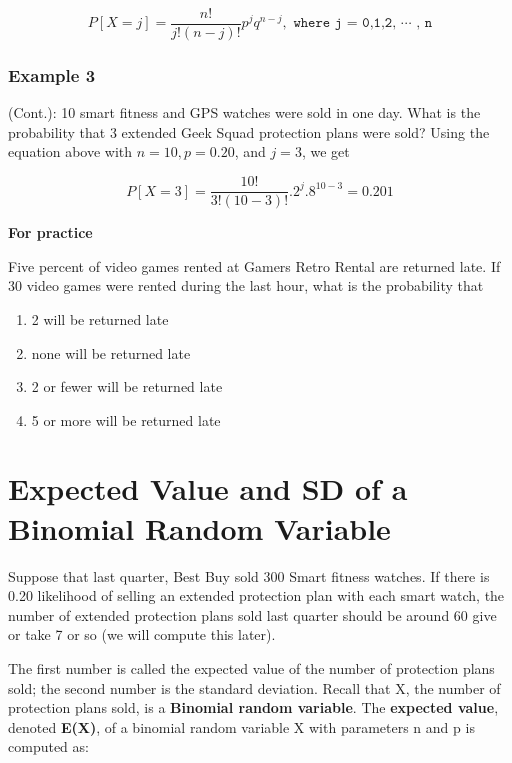 \documentclass[11pt, chapterprefix=true]{scrbook}\usepackage[]{graphicx}\usepackage[]{color}
\begin{document}
\begin{equation*}
 P[ X = j] = \frac{n!}{j! (n - j)!} p^j q^{n - j}, \texttt{ where j = 0,1,2, $\cdots$ , n}
 \end{equation*}


\subsubsection{Example 3} (Cont.):  10 smart fitness and GPS watches were sold in one day.  What is the probability that 3 extended Geek Squad protection plans were sold?  Using the equation above with $n = 10, p = 0.20$, and $j = 3$, we get

\begin{equation*}
 P[ X = 3] = \frac{10!}{3! (10 - 3)!} .2^j .8^{10 - 3} = 0.201
 \end{equation*}

\begin{minipage}[ht]{3cm}

\textbf{For practice}
\end{minipage}
\begin{minipage}[ht]{12cm}

Five percent of video games rented at Gamers Retro Rental are returned late. If 30 video games were rented during the last hour, what is the probability that

\begin{enumerate}
\item 2 will be returned late
\item none will be returned late
\item 2 or fewer will be returned late
\item 5 or more will be returned late
\end{enumerate}
\end{minipage}

\section{Expected Value and SD of a Binomial Random Variable}

Suppose that last quarter, Best Buy sold 300 Smart fitness watches.  If there is 0.20 likelihood of selling an extended protection plan with each smart watch, the number of extended protection plans sold last quarter should be around 60 give or take 7 or so (we will compute this later).

The first number is called the expected value of the number of protection plans sold; the second number is the standard deviation.  Recall that X, the number of protection plans sold, is a \textbf{Binomial random variable}.  The \textbf{expected value}, denoted \textbf{E(X)}, of a binomial random variable X with parameters n and p is computed as:
\end{document}
